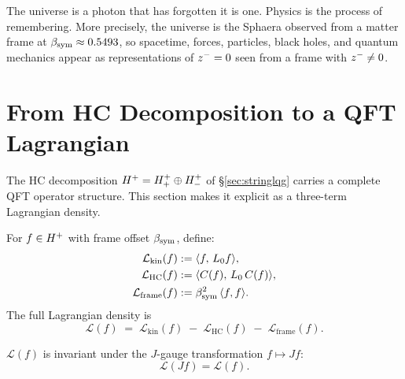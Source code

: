 \begin{remark}
The universe is a photon that has forgotten it is one. Physics is the
process of remembering. More precisely, the universe is the Sphaera
observed from a matter frame at $\beta_{\mathrm{sym}}\approx 0.5493$, so spacetime,
forces, particles, black holes, and quantum mechanics appear as
representations of $z^-=0$ seen from a frame with $z^-\neq 0$.
\end{remark}



\section{From HC Decomposition to a QFT Lagrangian}
\label{sec:lagrangian}

\begin{remark}
The HC decomposition $H^+=H^+_+\oplus H^+_-$ of \S\ref{sec:stringlqg}
carries a complete QFT operator structure.
This section makes it explicit as a three-term Lagrangian density.
\end{remark}

\begin{definition}\label{def:lagrangian}
For $f\in H^+$ with frame offset $\beta_{\mathrm{sym}}$, define:
\begin{align}
  \mathcal{L}_{\mathrm{kin}}(f)
    &:= \langle f,\,L_0 f\rangle,\label{eq:L_kin}\\
  \mathcal{L}_{\mathrm{HC}}(f)
    &:= \langle C(f),\,L_0\,C(f)\rangle,\label{eq:L_HC}\\
  \mathcal{L}_{\mathrm{frame}}(f)
    &:= \beta_{\mathrm{sym}}^2\,\langle f,f\rangle.\label{eq:L_frame}
\end{align}
The full Lagrangian density is
\[
  \mathcal{L}(f)
  \;=\;
  \mathcal{L}_{\mathrm{kin}}(f)
  \;-\;
  \mathcal{L}_{\mathrm{HC}}(f)
  \;-\;
  \mathcal{L}_{\mathrm{frame}}(f).
\]
\end{definition}

\begin{theorem}\label{thm:gauge-invariance}
$\mathcal{L}(f)$ is invariant under the $J$-gauge transformation
$f\mapsto Jf$:
\[
  \mathcal{L}(Jf) = \mathcal{L}(f).
\]
\end{theorem}

